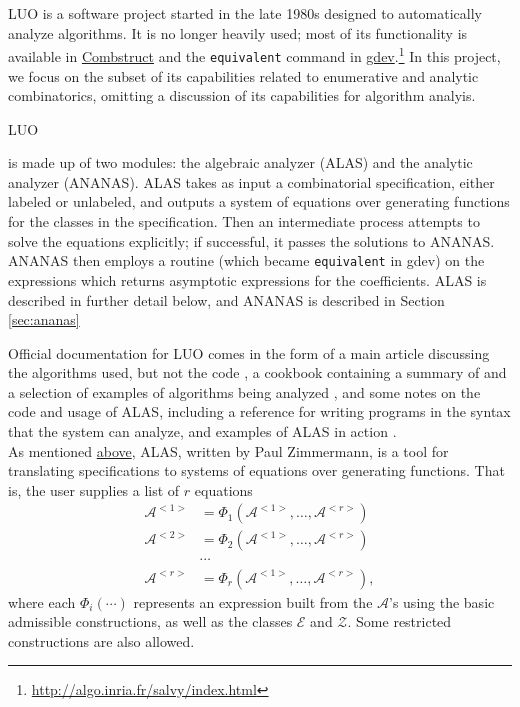\documentclass[12pt]{article}
\theoremstyle{plain}
\newcommand{\codefont}[1]{{\fontshape{n}\texttt{#1}}}
\begin{document}
LUO is a software project started in the late 1980s designed to automatically analyze algorithms.
It is no longer heavily used;
most of its functionality is available in \hyperref[sec:combstruct]{Combstruct} and the \codefont{equivalent} command in \hyperref[sec:gdev]{gdev}.\footnote{
 \url{http://algo.inria.fr/salvy/index.html}
}
In this project, we focus on the subset of its capabilities related to enumerative and analytic combinatorics,
omitting a discussion of its capabilities for algorithm analyis.

\hypertarget{alas}{LUO}
is made up of two modules: the algebraic analyzer (ALAS) and the analytic analyzer (ANANAS).
ALAS takes as input a combinatorial specification, either labeled or unlabeled, and outputs a system of equations over generating functions for the classes in the specification.
Then an intermediate process attempts to solve the equations explicitly; if successful, it passes the solutions to ANANAS.
ANANAS then employs a routine (which became \codefont{equivalent} in gdev) on the expressions which returns asymptotic expressions for the coefficients.
ALAS is described in further detail below, and ANANAS is described in Section \ref{sec:ananas}

Official documentation for LUO comes in the form of a main article discussing the algorithms used, but not the code \cite{assistant}, a cookbook containing a summary of \cite{assistant} and a selection of examples of algorithms being analyzed \cite{cookbook}, and some notes on the code and usage of ALAS, including a reference for writing programs in the syntax that the system can analyze, and examples of ALAS in action \cite{alas}.\\


As mentioned
\hyperlink{alas}{above},
ALAS, written by Paul Zimmermann, is a tool for translating specifications to systems of equations over generating functions.
That is, the user supplies a list of \(r\) equations
\begin{align*}
\mathcal{A}^{<1>} &= \Phi_1(\mathcal{A}^{<1>}, \dots, \mathcal{A}^{<r>}) \\
\mathcal{A}^{<2>} &= \Phi_2(\mathcal{A}^{<1>}, \dots, \mathcal{A}^{<r>}) \\
&\cdots \\
\mathcal{A}^{<r>} &= \Phi_r(\mathcal{A}^{<1>}, \dots, \mathcal{A}^{<r>}),
\end{align*}
where each \(\Phi_i(\cdots)\) represents an expression built from the \(\mathcal{A}\)'s using the basic admissible constructions, as well as the classes \(\mathcal{E}\) and \(\mathcal{Z}\).
Some restricted constructions are also allowed.
\end{document}
